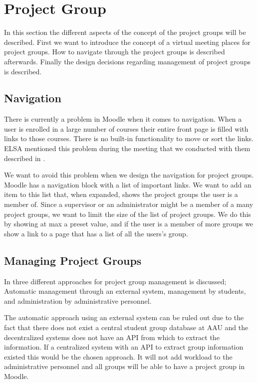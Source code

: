 \section{Project Group}
\label{sec:projectgroup}
In this section the different aspects of the concept of the project groups will be described.
First we want to introduce the concept of a virtual meeting places for project groups.
How to navigate through the project groups is described afterwards.
Finally the design decisions regarding management of project groups is described.



\subsection{Navigation}
\label{sub:designprojectgroupnavigation}
There is currently a problem in Moodle when it comes to navigation. 
When a user is enrolled in a large number of courses their entire front page is filled with links to those courses.
There is no built-in functionality to move or sort the links.
ELSA mentioned this problem during the meeting that we conducted with them described in .

We want to avoid this problem when we design the navigation for project groups.
Moodle has a navigation block with a list of important links.
We want to add an item to this list that, when expanded, shows the project groups the user is a member of.
Since a supervisor or an administrator might be a member of a many project groups, we want to limit the size of the list of project groups.
We do this by showing at max a preset value, and if the user is a member of more groups we show a link to a page that has a list of all the users's group.

\subsection{Managing Project Groups}
In  three different approaches for project group management is discussed; Automatic management through an external system, management by students, and administration by administrative personnel. 

The automatic approach using an external system can be ruled out due to the fact that there does not exist a central student group database at AAU and the decentralized systems does not have an API from which to extract the information. 
If a centralized system with an API to extract group information existed this would be the chosen approach.
It will not add workload to the administrative personnel and all groups will be able to have a project group in Moodle. 

